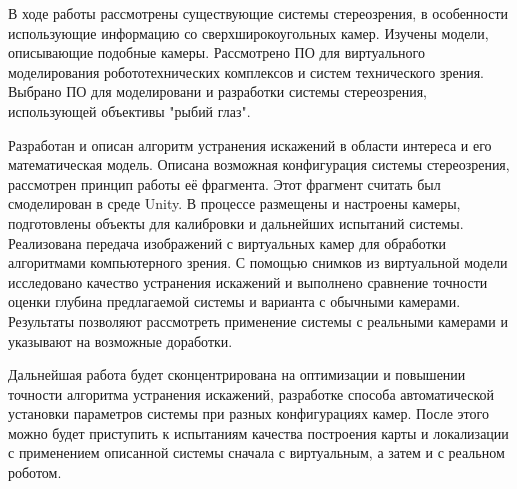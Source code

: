 
В ходе работы рассмотрены существующие системы стереозрения, в особенности использующие информацию
со сверхширокоугольных камер. Изучены модели, описывающие подобные камеры. Рассмотрено ПО для виртуального
 моделирования робототехнических комплексов и систем технического зрения. Выбрано ПО для моделировани и 
разработки системы стереозрения, использующей объективы "рыбий глаз". 

Разработан и описан алгоритм устранения искажений в области интереса и его математическая модель.   %
Описана возможная конфигурация системы стереозрения, рассмотрен принцип работы её фрагмента. Этот  фрагмент считать
был смоделирован в среде Unity. В процессе размещены и настроены камеры, подготовлены объекты для калибровки и 
дальнейших испытаний системы. Реализована передача изображений с виртуальных камер для обработки алгоритмами
компьютерного зрения. С помощью снимков из виртуальной модели исследовано качество устранения искажений и выполнено
 сравнение точности оценки глубина предлагаемой системы и варианта с обычными камерами. Результаты позволяют рассмотреть
применение системы с реальными камерами и указывают на возможные доработки.  %

Дальнейшая работа будет сконцентрирована на оптимизации и повышении точности алгоритма устранения искажений,
разработке способа автоматической установки параметров системы при разных конфигурациях камер. После этого можно
будет приступить к испытаниям качества построения карты и локализации с применением описанной системы сначала
с виртуальным, а затем и с реальном роботом.